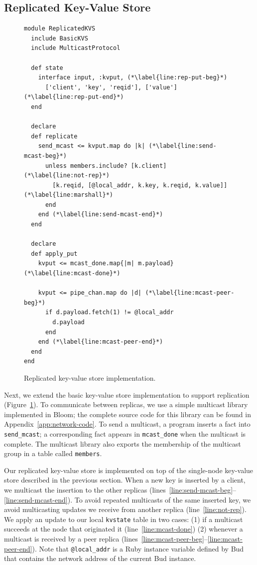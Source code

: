 \subsection{Replicated Key-Value Store}
\label{sec:rep-kvs}

\begin{figure}[t]
\begin{scriptsize}
\begin{lstlisting}
module ReplicatedKVS
  include BasicKVS
  include MulticastProtocol

  def state
    interface input, :kvput, (*\label{line:rep-put-beg}*)
      ['client', 'key', 'reqid'], ['value']  (*\label{line:rep-put-end}*)
  end

  declare
  def replicate
    send_mcast <= kvput.map do |k| (*\label{line:send-mcast-beg}*)
      unless members.include? [k.client]  (*\label{line:not-rep}*)
        [k.reqid, [@local_addr, k.key, k.reqid, k.value]]   (*\label{line:marshall}*)            
      end
    end (*\label{line:send-mcast-end}*)
  end

  declare
  def apply_put
    kvput <= mcast_done.map{|m| m.payload}  (*\label{line:mcast-done}*)

    kvput <= pipe_chan.map do |d| (*\label{line:mcast-peer-beg}*)
      if d.payload.fetch(1) != @local_addr
        d.payload
      end
    end (*\label{line:mcast-peer-end}*)
  end
end
\end{lstlisting}
\vspace{-10pt}
\caption{Replicated key-value store implementation.}
\label{fig:kvs-repl}
\end{scriptsize}
\vspace{-2pt}
\end{figure}

Next, we extend the basic key-value store implementation to support replication
(Figure~\ref{fig:kvs-repl}). To communicate between replicas, we use a simple
multicast library implemented in Bloom; the complete source code for this
library can be found in Appendix~\ref{app:network-code}. To send a multicast, a
program inserts a fact into \texttt{send\_mcast}; a corresponding fact appears
in \texttt{mcast\_done} when the multicast is complete. The multicast library
also exports the membership of the multicast group in a table called
\texttt{members}.

Our replicated key-value store is implemented on top of the single-node
key-value store described in the previous section. When a new key is inserted by
a client, we multicast the insertion to the other replicas
(lines~\ref{line:send-mcast-beg}--\ref{line:send-mcast-end}). To avoid repeated
multicasts of the same inserted key, we avoid multicasting updates we receive
from another replica (line~\ref{line:not-rep}). We apply an update to our local
\texttt{kvstate} table in two cases: (1) if a multicast succeeds at the node
that originated it (line~\ref{line:mcast-done}) (2) whenever a multicast is
received by a peer replica
(lines~\ref{line:mcast-peer-beg}--\ref{line:mcast-peer-end}).  Note that
\texttt{@local\_addr} is a Ruby instance variable defined by Bud that contains the
network address of the current Bud instance.

